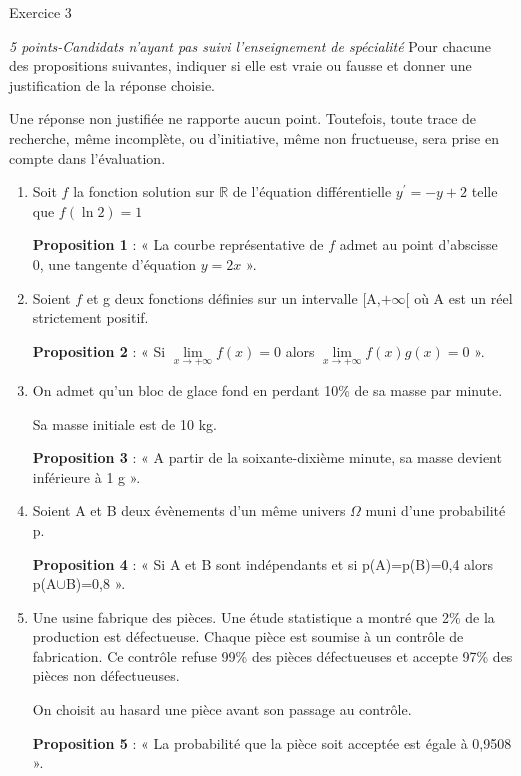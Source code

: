 
%
\begin{h2}Exercice 3\end{h2}
\textit{5 points-Candidats n'ayant pas suivi l'enseignement de spécialité}
Pour chacune des propositions suivantes, indiquer si elle est vraie ou fausse et donner une justification de la réponse choisie.
\par
Une réponse non justifiée ne rapporte aucun point. Toutefois, toute trace de recherche, même incomplète, ou d'initiative, même non fructueuse, sera prise en compte dans l'évaluation.
\begin{enumerate}
     \item
     Soit $f$ la fonction solution sur $\mathbb{R}$ de l'équation différentielle $y^{\prime}=-y+2$ telle que $f\left(\ln 2\right)=1$
\par
     \textbf{Proposition 1} : « La courbe représentative de $f$ admet au point d'abscisse 0, une tangente d'équation $y=2x$ ».
     \item
     Soient $f$ et g deux fonctions définies sur un intervalle [A,$+\infty $[ où A est un réel strictement positif.
\par
     \textbf{Proposition 2} : « Si $\lim\limits_{x\rightarrow +\infty }f\left(x\right)=0$ alors $\lim\limits_{x\rightarrow +\infty }f\left(x\right)g\left(x\right)=0$ ».
     \item
     On admet qu'un bloc de glace fond en perdant 10\% de sa masse par minute.
     \par
     Sa masse initiale est de 10 kg.
\par
     \textbf{Proposition 3} : « A partir de la soixante-dixième minute, sa masse devient inférieure à 1 g ».
     \item
     Soient A et B deux évènements d'un même univers $\Omega $ muni d'une probabilité p.
\par
     \textbf{Proposition 4} : « Si A et B sont indépendants et si p(A)=p(B)=0,4 alors p(A$\cup $B)=0,8 ».
     \item
     Une usine fabrique des pièces. Une étude statistique a montré que 2\% de la production est défectueuse. Chaque pièce est soumise à un contrôle de fabrication. Ce contrôle refuse 99\% des pièces défectueuses et accepte 97\% des pièces non défectueuses.
     \par
     On choisit au hasard une pièce avant son passage au contrôle.
\par
     \textbf{Proposition 5 }: « La probabilité que la pièce soit acceptée est égale à 0,9508 ».
\end{enumerate}
